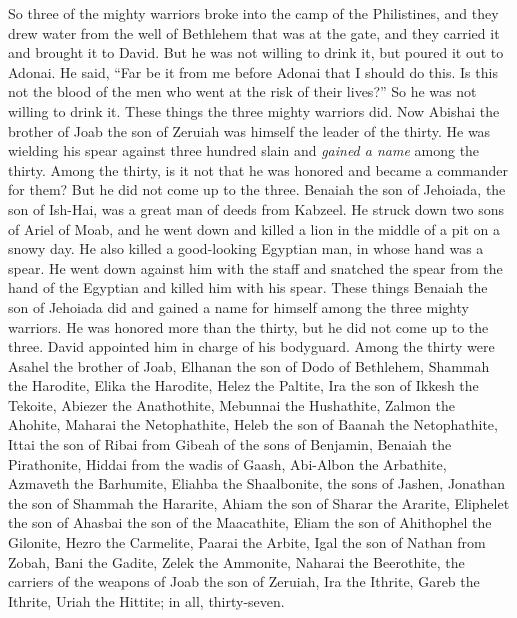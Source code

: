 \begin{biblechapter}
\verse So three of the mighty warriors broke into the camp of the Philistines, and they drew water from the well of Bethlehem that was at the gate, and they carried it and brought it to David. But he was not willing to drink it, but poured it out to Adonai.
\verse He said, “Far be it from me before Adonai that I should do this. Is this not the blood of the men who went at the risk of their lives?” So he was not willing to drink it. These things the three mighty warriors did.
\verse Now Abishai the brother of Joab the son of Zeruiah was himself the leader of the thirty. He was wielding his spear against three hundred slain and \textit{gained a name} among the thirty.
\verse Among the thirty, is it not that he was honored and became a commander for them? But he did not come up to the three.
\verse Benaiah the son of Jehoiada, the son of Ish-Hai, was a great man of deeds from Kabzeel. He struck down two sons of Ariel of Moab, and he went down and killed a lion in the middle of a pit on a snowy day.
\verse He also killed a good-looking Egyptian man, in whose hand was a spear. He went down against him with the staff and snatched the spear from the hand of the Egyptian and killed him with his spear.
\verse These things Benaiah the son of Jehoiada did and gained a name for himself among the three mighty warriors.
\verse He was honored more than the thirty, but he did not come up to the three. David appointed him in charge of his bodyguard.
 Among the thirty were Asahel the brother of Joab, Elhanan the son of Dodo of Bethlehem,
\verse Shammah the Harodite, Elika the Harodite,
\verse Helez the Paltite, Ira the son of Ikkesh the Tekoite,
\verse Abiezer the Anathothite, Mebunnai the Hushathite,
\verse Zalmon the Ahohite, Maharai the Netophathite,
\verse Heleb the son of Baanah the Netophathite, Ittai the son of Ribai from Gibeah of the sons of Benjamin,
\verse Benaiah the Pirathonite, Hiddai from the wadis of Gaash,
\verse Abi-Albon the Arbathite, Azmaveth the Barhumite,
\verse Eliahba the Shaalbonite, the sons of Jashen, Jonathan
\verse the son of Shammah the Hararite, Ahiam the son of Sharar the Ararite,
\verse Eliphelet the son of Ahasbai the son of the Maacathite, Eliam the son of Ahithophel the Gilonite,
\verse Hezro the Carmelite, Paarai the Arbite,
\verse Igal the son of Nathan from Zobah, Bani the Gadite,
\verse Zelek the Ammonite, Naharai the Beerothite, the carriers of the weapons of Joab the son of Zeruiah,
\verse Ira the Ithrite, Gareb the Ithrite,
\verse Uriah the Hittite; in all, thirty-seven.
\end{biblechapter}

